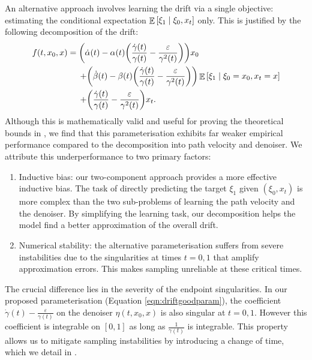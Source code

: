 An alternative approach involves learning the drift via a single objective: estimating the conditional expectation \(\mathop{\mathbb{E}}\qty[\xi_{1} \mid \xi_{0}, x_{t}]\) only. This is justified by the following decomposition of the drift:
\begin{align}
  f(t, x_{0}, x) &=  \qty(\dot{\alpha}(t) - \alpha(t)\qty(\frac{\dot{\gamma}(t)}{\gamma(t)} - \frac{\varepsilon}{\gamma^{2}(t)})) x_{0} \notag\\
  &\mathrel{\phantom{=}}\, + \qty(\dot{\beta}(t) - \beta(t)\qty(\frac{\dot{\gamma}(t)}{\gamma(t)} - \frac{\varepsilon}{\gamma^{2}(t)})) \mathop{\mathbb{E}}\qty[\xi_{1} \mid \xi_{0} = x_{0}, x_{t} = x]\notag \\
  &\mathrel{\phantom{=}}\, + \qty(\frac{\dot{\gamma}(t)}{\gamma(t)} - \frac{\varepsilon}{\gamma^{2}(t)}) x_{t}. \label{eqn:driftbadparam}
\end{align}
Although this is mathematically valid and useful for proving the theoretical bounds in , we find that this parameterisation exhibits far weaker empirical performance compared to the decomposition into path velocity and denoiser. We attribute this underperformance to two primary factors:
\begin{enumerate}
  \item Inductive bias: our two-component approach provides a more effective inductive bias. The task of directly predicting the target \(\xi_{1}\) given \((\xi_{0}, x_{t})\) is more complex than the two sub-problems of learning the path velocity and the denoiser. By simplifying the learning task, our decomposition helps the model find a better approximation of the overall drift.
  \item Numerical stability: the alternative parameterisation suffers from severe instabilities due to the singularities at times \(t = 0 ,1\) that amplify approximation errors. This makes sampling unreliable at these critical times.
\end{enumerate}

The crucial difference lies in the severity of the endpoint singularities. In our proposed parameterisation (Equation \ref{eqn:driftgoodparam}),  the coefficient \(\dot{\gamma}(t) - \frac{\varepsilon}{\gamma(t)}\) on the denoiser \(\eta(t, x_{0}, x)\) is also singular at \(t = 0, 1\). However this coefficient is integrable on \([0, 1]\) as long as \(\frac{1}{\gamma(t)}\) is integrable. This property allows us to mitigate sampling instabilities by introducing a change of time, which we detail in .

